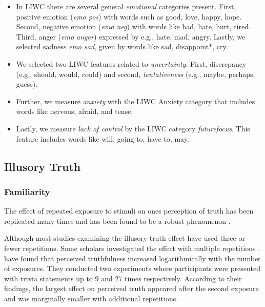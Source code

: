 \documentclass[
10pt, %
a4paper, %
oneside, %
headinclude,footinclude, %
] {book}%
\begin{document}
\begin{itemize}
    \item In LIWC there are several general \textit{emotional} categories present. First, positive emotion (\textit{emo pos}) with words such as good, love, happy, hope. Second, negative emotion (\textit{emo neg}) with words like bad, hate, hurt, tired. Third, anger (\textit{emo anger}) expressed by e.g., hate, mad, angry. Lastly, we selected sadness \textit{emo sad}, given by words like sad, disappoint*, cry.
    \item We selected two LIWC features related to \textit{uncertainty}. First, discrepancy (e.g., should, would, could) and second, \textit{tentativeness} (e.g., maybe, perhaps, guess).
    \item Further, we measure \textit{anxiety} with the LIWC Anxiety category that includes words like nervous, afraid, and tense.
    \item Lastly, we measure \textit{lack of control} by the LIWC category \textit{futurefocus}. This feature includes words like will, going to, have to, may.
\end{itemize}



\subsection{Illusory Truth}



\subsubsection{Familiarity}



The effect of repeated exposure to stimuli on ones perception of truth has been replicated many times and has been found to be a robust phenomenon \citep{dechene2010truth}. 

Although most studies examining the illusory truth effect have used three or fewer repetitions. Some scholars investigated the effect with multiple repetitions \citep{koch2013helpful, difonzo2016validity, hassan2021effects}. \cite{hassan2021effects} have found that perceived truthfulness increased logarithmically with the number of exposures. They conducted two experiments where participants were presented with trivia statements up to 9 and 27 times respectively. According to their findings, the largest effect on perceived truth appeared after the second exposure and was marginally smaller with additional repetitions.
\end{document}
